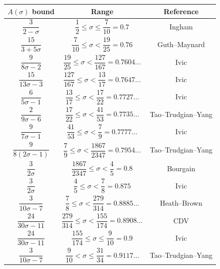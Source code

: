 \documentclass[12pt]{amsart}
\begin{document}
\begin{table}[ht]
\def\arraystretch{1.2}
    \centering
    \small
    \begin{tabular}{|c|c|c|}
    \hline
    $A(\sigma)$ bound & Range & Reference\\
    \hline
    $\dfrac{3}{2 - \sigma}$ & $\dfrac{1}{2} \leq \sigma \le \dfrac{7}{10} = 0.7$ & Ingham \cite{ingham} \\
    \hline
    $\dfrac{15}{3+5\sigma}$ & $\dfrac{7}{10} \leq \sigma < \dfrac{19}{25} = 0.76$ & Guth--Maynard \cite{GuthMaynard}\\
    \hline
    $\dfrac{9}{8\sigma - 2}$ & $\dfrac{19}{25} \leq \sigma < \dfrac{127}{167} = 0.7604\ldots$ & Ivic \cite{ivic} \\
    \hline
    $\dfrac{15}{13\sigma - 3}$ & $\dfrac{127}{167} \leq \sigma < \dfrac{13}{17} = 0.7647\ldots$ & Ivic \cite{ivic}\\
    \hline
    $\dfrac{6}{5\sigma - 1}$ & $\dfrac{13}{17} \leq \sigma < \dfrac{17}{22} = 0.7727\ldots$ & Ivic \cite{ivic}\\
    \hline
    $\dfrac{2}{9\sigma - 6}$ & $\dfrac{17}{22} \leq \sigma < \dfrac{41}{53} = 0.7735\ldots$ & Tao--Trudgian--Yang \cite{tty}\\
    \hline
    $\dfrac{9}{7\sigma - 1}$ & $\dfrac{41}{53} \leq \sigma < \dfrac{7}{9} = 0.7777\ldots$ & Ivic \cite{ivic}\\
    \hline
    $\dfrac{9}{8(2\sigma-1)}$ & $\dfrac{7}{9} \le \sigma < \dfrac{1867}{2347} = 0.7954\ldots$ & Tao--Trudgian--Yang \cite{tty} \\
    \hline
    $\dfrac{3}{2\sigma}$ & $\dfrac{1867}{2347} \le \sigma < \dfrac{4}{5} = 0.8$ & Bourgain \cite{bourgain} \\
    \hline
    $\dfrac{3}{2\sigma}$ & $\dfrac{4}{5} \le \sigma < \dfrac{7}{8} = 0.875$ & Ivic \cite{ivic} \\
    \hline
    $\dfrac{3}{10\sigma - 7}$ & $\dfrac{7}{8} \le \sigma < \dfrac{279}{314} = 0.8885\ldots$ & Heath--Brown \cite{HB-2} \\
    \hline
    $\dfrac{24}{30\sigma - 11}$ & $\dfrac{279}{314} \le \sigma < \dfrac{155}{174} = 0.8908\ldots$ & CDV \cite{cdv} \\
    \hline
    $\dfrac{24}{30\sigma - 11}$& $\dfrac{155}{174} \le \sigma \le \dfrac{9}{10} = 0.9$ & Ivic \cite{ivic}\\
    \hline
    $\dfrac{3}{10\sigma - 7}$ & $\dfrac{9}{10} < \sigma \le \dfrac{31}{34} = 0.9117\ldots$ & Tao--Trudgian--Yang \cite{tty}\\

\end{tabular}
\end{table}
\end{document}
